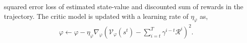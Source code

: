 \documentclass[letterpaper]{article} %
\newcommand\red[1]{\textcolor{red}{#1}}
\newcommand\rjf[1]{\textcolor{red}{\{RJF: #1\}}}
\newcommand\yxy[1]{\textcolor{blue}{\{YXY: #1\}}}
\begin{document}
squared error loss of estimated state-value and discounted sum of rewards in the trajectory.
The critic model is updated with a learning rate of $\eta_{\varphi}$ as,
\begin{align}
\label{eqn:critic_gradient}
\varphi \leftarrow \varphi-\eta_{\varphi}\nabla_\varphi(\mathcal{V}_\varphi\left(s^t\right)-\sum_{i=t}^T \gamma^{i-t} \mathcal{R}^i)^2.
\end{align}
\end{document}
